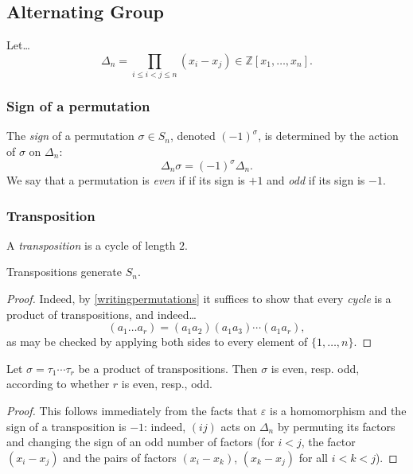 \subsection{Alternating Group}\label{alternatinggroup}

Let\dots
$$\Delta_n = \prod_{i \leq i < j \leq n}(x_i - x_j) \in \mathbb{Z}[x_1, \dots, x_n].$$

\subsubsection{Sign of a permutation}\label{signpermutation}
The \emph{sign} of a permutation $\sigma \in S_n$, denoted $(-1)^{\sigma}$, is determined
by the action of $\sigma$ on $\Delta_n$:
$$\Delta_n \sigma = (-1)^{\sigma} \Delta_n.$$
We say that a permutation is \emph{even} if if its sign is $+1$ and \emph{odd} if its sign is $-1$.

\subsubsection{Transposition}\label{transposition}
A \emph{transposition} is a cycle of length $2$.

\begin{lemma}
Transpositions generate $S_n$.
\end{lemma}

\begin{proof}
Indeed, by \ref{writingpermutations} it suffices to show that every \emph{cycle} is a product of transpositions, and indeed\dots
$$(a_1 \dots a_r) = (a_1a_2)(a_1a_3)\cdots(a_1a_r),$$
as may be checked by applying both sides to every element of $\{ 1, \dots, n \}$.
\end{proof}

\begin{lemma}
Let $\sigma = \tau_1 \cdots \tau_r$ be a product of transpositions. Then $\sigma$ is even, resp. odd, according to whether $r$ is even, resp., odd.
\end{lemma}

\begin{proof}
This follows immediately from the facts that $\varepsilon$ is a homomorphism and the sign of a transposition is $-1$: indeed, $(ij)$ acts on $\Delta_n$ by
permuting its factors and changing the sign of an odd number of factors (for $i < j$, the factor $(x_i - x_j)$ and the pairs of factors $(x_i - x_k)$, $(x_k - x_j)$
for all $i < k < j$).
\end{proof}


